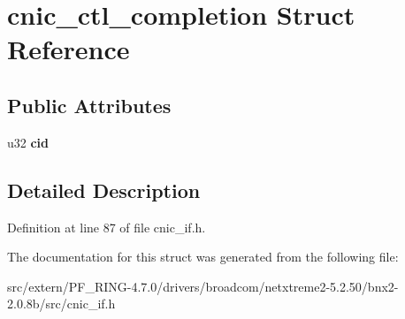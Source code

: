 \hypertarget{structcnic__ctl__completion}{
\section{cnic\_\-ctl\_\-completion Struct Reference}
\label{structcnic__ctl__completion}
}
\subsection*{Public Attributes}
\begin{DoxyCompactItemize}
\item 
\hypertarget{structcnic__ctl__completion_a4677dbbcec5c7a78488043867a884b9c}{
u32 {\bfseries cid}}
\label{structcnic__ctl__completion_a4677dbbcec5c7a78488043867a884b9c}

\end{DoxyCompactItemize}


\subsection{Detailed Description}


Definition at line 87 of file cnic\_\-if.h.



The documentation for this struct was generated from the following file:\begin{DoxyCompactItemize}
\item 
src/extern/PF\_\-RING-\/4.7.0/drivers/broadcom/netxtreme2-\/5.2.50/bnx2-\/2.0.8b/src/cnic\_\-if.h\end{DoxyCompactItemize}
